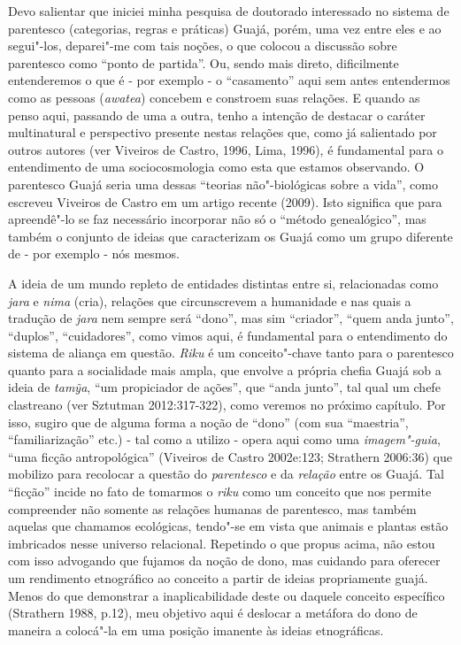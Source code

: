 Devo salientar que iniciei minha pesquisa de doutorado interessado no
sistema de parentesco (categorias, regras e práticas) Guajá, porém, uma
vez entre eles e ao segui"-los, deparei"-me com tais noções, o que colocou
a discussão sobre parentesco como ``ponto de partida''. Ou, sendo mais
direto, dificilmente entenderemos o que é - por exemplo - o
``casamento'' aqui sem antes entendermos como as pessoas (\emph{awatea})
concebem e constroem suas relações. E quando as penso aqui, passando de
uma a outra, tenho a intenção de destacar o caráter multinatural e
perspectivo presente nestas relações que, como já salientado por outros
autores (ver Viveiros de Castro, 1996, Lima, 1996), é fundamental para o
entendimento de uma sociocosmologia como esta que estamos observando. O
parentesco Guajá seria uma dessas ``teorias não"-biológicas sobre a
vida'', como escreveu Viveiros de Castro em um artigo recente (2009).
Isto significa que para apreendê"-lo se faz necessário incorporar não só
o ``método genealógico'', mas também o conjunto de ideias que
caracterizam os Guajá como um grupo diferente de - por exemplo - nós
mesmos.

A ideia de um mundo repleto de entidades distintas entre si,
relacionadas como \emph{jara} e \emph{nima} (cria), relações que
circunscrevem a humanidade e nas quais a tradução de \emph{jara} nem
sempre será ``dono'', mas sim ``criador'', ``quem anda junto'', ``duplos'',
``cuidadores'', como vimos aqui, é fundamental para o entendimento do
sistema de aliança em questão. \emph{Riku} é um conceito"-chave tanto
para o parentesco quanto para a socialidade mais ampla, que envolve a
própria chefia Guajá sob a ideia de \emph{tamỹa}, ``um propiciador de
ações'', que ``anda junto'', tal qual um chefe clastreano (ver Sztutman
2012:317-322), como veremos no próximo capítulo. Por isso, sugiro que de
alguma forma a noção de ``dono'' (com sua ``maestria'', ``familiarização''
etc.) - tal como a utilizo - opera aqui como uma \emph{imagem"-guia},
``uma ficção antropológica'' (Viveiros de Castro 2002e:123; Strathern
2006:36) que mobilizo para recolocar a questão do \emph{parentesco} e da
\emph{relação} entre os Guajá. Tal ``ficção'' incide no fato de tomarmos o
\emph{riku} como um conceito que nos permite compreender não somente as
relações humanas de parentesco, mas também aquelas que chamamos
ecológicas, tendo"-se em vista que animais e plantas estão imbricados
nesse universo relacional. Repetindo o que propus acima, não estou com
isso advogando que fujamos da noção de dono, mas cuidando para oferecer
um rendimento etnográfico ao conceito a partir de ideias propriamente
guajá. Menos do que demonstrar a inaplicabilidade deste ou daquele
conceito específico (Strathern 1988, p.12), meu objetivo aqui é deslocar
a metáfora do dono de maneira a colocá"-la em uma posição imanente às
ideias etnográficas.

